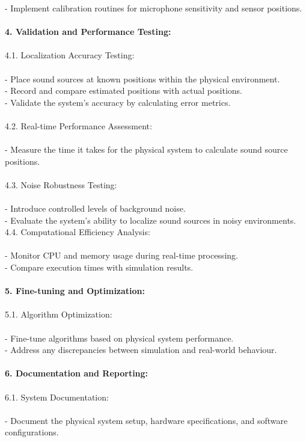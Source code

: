 \documentclass[a4paper,11pt]{article}
\begin{document}
- Implement calibration routines for microphone sensitivity and sensor positions.\\\\
\textbf{4. Validation and Performance Testing:} \\\\
4.1. Localization Accuracy Testing: \\\\
- Place sound sources at known positions within the physical environment. \\
- Record and compare estimated positions with actual positions. \\
- Validate the system's accuracy by calculating error metrics. \\\\
4.2. Real-time Performance Assessment: \\\\
- Measure the time it takes for the physical system to calculate sound source positions. \\\\
4.3. Noise Robustness Testing: \\\\
- Introduce controlled levels of background noise. \\
- Evaluate the system's ability to localize sound sources in noisy environments. \\
4.4. Computational Efficiency Analysis: \\\\
- Monitor CPU and memory usage during real-time processing. \\
- Compare execution times with simulation results. \\\\
\textbf{5. Fine-tuning and Optimization:} \\\\
5.1. Algorithm Optimization: \\\\
- Fine-tune algorithms based on physical system performance.\\ 
- Address any discrepancies between simulation and real-world behaviour. \\\\
\textbf{6. Documentation and Reporting:}  \\\\ 
6.1. System Documentation: \\\\
- Document the physical system setup, hardware specifications, and software configurations. \\\\
\end{document}
